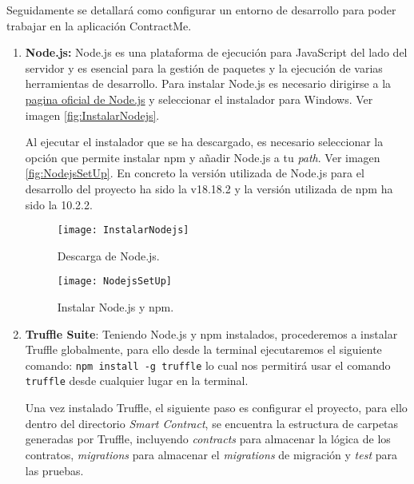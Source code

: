 Seguidamente se detallará como configurar un entorno de desarrollo para poder trabajar en la aplicación ContractMe.

\begin{enumerate}

\item \textbf{Node.js:} Node.js es una plataforma de ejecución para JavaScript del lado del servidor y es esencial para la gestión de paquetes y la ejecución de varias herramientas de desarrollo. 
Para instalar Node.js es necesario dirigirse a la \href{https://nodejs.org/en}{pagina oficial de Node.js} y seleccionar el instalador para Windows. Ver imagen \ref{fig:InstalarNodejs}.

Al ejecutar el instalador que se ha descargado, es necesario seleccionar la opción que permite instalar npm y añadir Node.js a tu \textit{path}. Ver imagen \ref{fig:NodejsSetUp}.  
En concreto la versión utilizada de Node.js para el desarrollo del proyecto ha sido la v18.18.2 y la versión utilizada de npm ha sido la 10.2.2.

\begin{figure}[h]
	\label{img:InstalarNodejs}
	\centering
	\texttt{[image: InstalarNodejs]}
	\caption[Descarga de Node.js]{Descarga de Node.js.}
\end{figure}

\begin{figure}[h]
	\label{img:NodejsSetUp}
	\centering
	\texttt{[image: NodejsSetUp]}
	\caption[Instalar Node.js y npm]{Instalar Node.js y npm.}
\end{figure}

\item \textbf{Truffle Suite}: Teniendo Node.js y npm instalados, procederemos a instalar Truffle globalmente, para ello desde la terminal ejecutaremos el siguiente comando: \texttt{npm install -g truffle} lo cual nos permitirá usar el comando \texttt{truffle} desde cualquier lugar en la terminal.

Una vez instalado Truffle, el siguiente paso es configurar el proyecto, para ello dentro del directorio \textit{Smart Contract}, se encuentra la estructura de carpetas generadas por Truffle, incluyendo \textit{contracts} para almacenar la lógica de los contratos, \textit{migrations} para almacenar el \textit{migrations} de migración y \textit{test} para las pruebas.


\end{enumerate}
